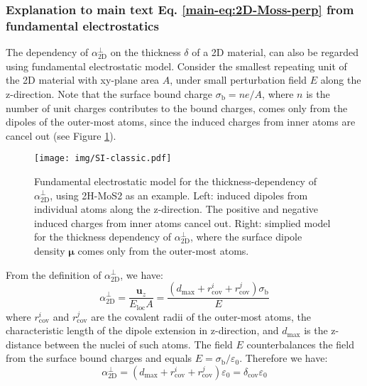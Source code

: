 \documentclass[manuscript=suppinfo,email=true,hyperref=true,keywords=false]{achemso}
\begin{document}
\subsubsection{Explanation to main text Eq. \ref{main-eq:2D-Moss-perp}
  from fundamental electrostatics}
\label{sssec:theory-3}

The dependency of $\alpha_{\mathrm{2D}}^{\perp}$ on the thickness
$\delta$ of a 2D material, can also be regarded using fundamental
electrostatic model. Consider the smallest repeating unit of the 2D
material with xy-plane area $A$, under small perturbation field $E$
along the z-direction.  Note that the surface bound charge
$\sigma_{\mathrm{b}}=n e /A$, where $n$ is the number of unit charges
contributes to the bound charges, comes only from the dipoles of the
outer-most atoms, since the induced charges from inner atoms are
cancel out (see Figure \ref{fig:classic-model}).
\begin{figure}[htbp]
  \centering
  \texttt{[image: img/SI-classic.pdf]}
  \caption{Fundamental electrostatic model for the
    thickness-dependency of $\alpha_{\mathrm{2D}}^{\perp}$, using 2H-MoS2 as an
    example. Left: induced dipoles from individual atoms along the
    z-direction. The positive and negative induced charges from inner
    atoms cancel out. Right: simplied model for the thickness
    dependency of $\alpha_{\mathrm{2D}}^{\perp}$, where the surface dipole density
    $\boldsymbol{\mu}$ comes only from the outer-most atoms.}
  \label{fig:classic-model}
\end{figure}
From the definition of
$\alpha_{\mathrm{2D}}^{\perp}$, we have:
\begin{equation}
  \label{eq:alpha-classic}
  \alpha_{\mathrm{2D}}^{\perp} = \frac{\boldsymbol{u}_{z}}{E_{\mathrm{loc}} A}
  = \frac{(d_{\mathrm{max}} + r_{\mathrm{cov}}^{i} + r_{\mathrm{cov}}^{j}) \sigma_{\mathrm{b}}}{E}
\end{equation}
where $r_{\mathrm{cov}}^{i}$ and $r_{\mathrm{cov}}^{j}$ are the
covalent radii of the outer-most atoms, the characteristic length of
the dipole extension in z-direction, and $d_{\mathrm{max}}$ is the
z-distance between the nuclei of such atoms.  The field $E$
counterbalances the field from the surface bound charges and equals
$E = \sigma_{\mathrm{b}}/\varepsilon_{0}$. Therefore we have:
\begin{equation}
  \label{eq:alpha-classic-2}
  \alpha_{\mathrm{2D}}^{\perp} = (d_{\mathrm{max}} + r_{\mathrm{cov}}^{i} + r_{\mathrm{cov}}^{j})\varepsilon_{0}
                = \delta_{\mathrm{cov}} \varepsilon_{0}
\end{equation}
\end{document}
